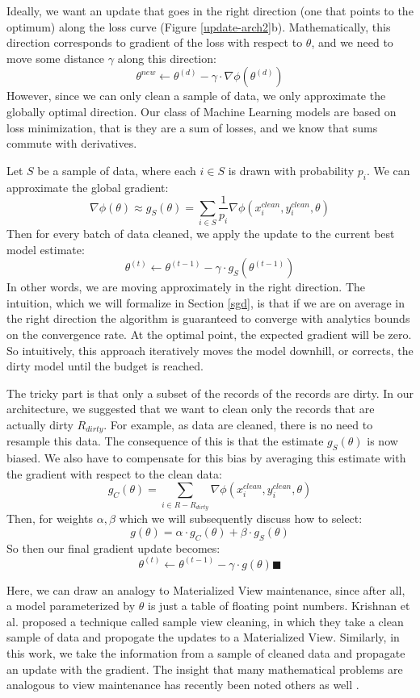 Ideally, we want an update that goes in the right direction (one that points to the optimum) along the loss curve (Figure \ref{update-arch2}b).
Mathematically, this direction corresponds to gradient of the loss with respect to $\theta$, and we need to move some distance $\gamma$ along this direction:
\[
\theta^{new} \leftarrow \theta^{(d)} - \gamma \cdot \nabla\phi(\theta^{(d)})
\]
However, since we can only clean a sample of data, we only approximate the globally optimal direction.
Our class of Machine Learning models are based on loss minimization, that is they are a sum of losses, and we know that sums commute with derivatives.

Let $S$ be a sample of data, where each $i \in S$ is drawn with probability $p_i$.
We can approximate the global gradient:
\[
\nabla\phi(\theta) \approx g_{S}(\theta) = \sum_{i \in S}\frac{1}{p_i}\nabla\phi(x_i^{clean},y_i^{clean},\theta)
\]
Then for every batch of data cleaned, we apply the update to the current best model estimate:
\[
\theta^{(t)} \leftarrow \theta^{(t-1)} - \gamma \cdot g_{S}(\theta^{(t-1)})
\]
In other words, we are moving approximately in the right direction.
The intuition, which we will formalize in Section \ref{sgd}, is that if we are on average in the right direction the algorithm is guaranteed to converge with analytics bounds on the convergence rate.
At the optimal point, the expected gradient will be zero.
So intuitively, this approach iteratively moves the model downhill, or corrects, the dirty model until the budget is reached.

The tricky part is that only a subset of the records of the records are dirty.
In our architecture, we suggested that we want to clean only the records that
are actually dirty $R_{dirty}$.
For example, as data are cleaned, there is no need to resample this data.
The consequence of this is that the estimate $g_{S}(\theta)$ is now biased.
We also have to compensate for this bias by averaging this estimate with the gradient with respect to the clean data:
\[
g_C(\theta) = \sum_{i \in R - R_{dirty}}\nabla\phi(x_i^{clean},y_i^{clean},\theta)
\]
Then, for weights $\alpha,\beta$ which we will subsequently discuss how to select:
\[
g(\theta) = \alpha \cdot g_C(\theta) + \beta \cdot g_S(\theta)
\]
So then our final gradient update becomes:
\[
\theta^{(t)} \leftarrow \theta^{(t-1)} - \gamma \cdot g(\theta) \blacksquare
\]

Here, we can draw an analogy to Materialized View maintenance, since after all, a model parameterized by $\theta$ is just a table of floating point numbers.
Krishnan et al. proposed a technique called sample view cleaning, in which they take a clean sample of data and propogate the updates to a Materialized View.
Similarly, in this work, we take the information from a sample of cleaned data and propagate an update with the gradient.
The insight that many mathematical problems are analogous to view maintenance has recently been noted others as well \cite{nikolic2014linview}.

